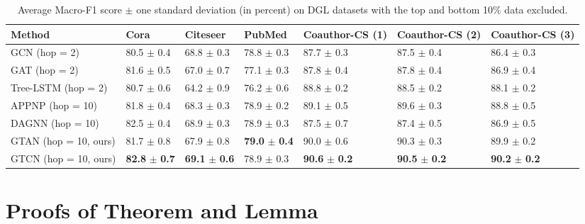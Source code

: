 \documentclass[lettersize,journal]{IEEEtran}
\theoremstyle{plain}
\theoremstyle{definition}
\theoremstyle{remark}
\begin{document}
\appendices
\begin{table*}[t]
	\caption{Average Macro-F1 score $\pm$ one standard deviation (in percent) on DGL datasets with the top and bottom 10\% data excluded.}
	\label{tb:F1}
	\begin{center}
		\begin{tabularx}{0.9\textwidth}{p{3.5cm} p{1.5cm} p{1.5cm} p{1.5cm} p{1.5cm} p{1.5cm} p{1.5cm}}
			\toprule
			\textbf{Method}  &\textbf{Cora} &\textbf{Citeseer}
			&\textbf{PubMed} &\textbf{Coauthor-CS (1)}
			&\textbf{Coauthor-CS (2)}
			&\textbf{Coauthor-CS (3)} \\
			\midrule
			GCN (hop = 2)  &80.5 $\pm$ 0.4 &68.8 $\pm$ 0.3 &78.8 $\pm$ 0.3 
			&87.7 $\pm$ 0.3 &87.5 $\pm$ 0.4 &86.4 $\pm$ 0.3\\
			GAT (hop = 2) &81.6 $\pm$ 0.5 &67.0 $\pm$ 0.7 &77.1 $\pm$ 0.3 &87.8 $\pm$ 0.4 &87.8 $\pm$ 0.4 &86.9 $\pm$ 0.4\\
			Tree-LSTM (hop = 2) &80.7 $\pm$ 0.6 &64.2 $\pm$ 0.9 &76.2 $\pm$ 0.6 &88.8 $\pm$ 0.2 &88.5 $\pm$ 0.2 &88.1 $\pm$ 0.2\\
			APPNP (hop = 10) &81.8 $\pm$ 0.4 &68.3 $\pm$ 0.3 &78.9 $\pm$ 0.2 &89.1 $\pm$ 0.5 &89.6 $\pm$ 0.3 &88.8 $\pm$ 0.5\\
			DAGNN (hop = 10) &82.5 $\pm$ 0.4 &68.9 $\pm$ 0.3 &78.9 $\pm$ 0.3 &87.5 $\pm$ 0.7 &87.4 $\pm$ 0.5 &86.9 $\pm$ 0.5\\
\midrule
			GTAN (hop = 10, ours) &81.7 $\pm$ 0.8 &67.9 $\pm$ 0.8 &\textbf{79.0} $\pm$ \textbf{0.4} &90.0 $\pm$ 0.6 &90.3 $\pm$ 0.3 &89.9 $\pm$ 0.2\\
			GTCN (hop = 10, ours) &\textbf{82.8} $\pm$ \textbf{0.7} &\textbf{69.1} $\pm$ \textbf{0.6} &78.9 $\pm$ 0.3 &\textbf{90.6} $\pm$ \textbf{0.2} &\textbf{90.5} $\pm$ \textbf{0.2} &\textbf{90.2} $\pm$ \textbf{0.2}\\
			\bottomrule
		\end{tabularx}
	\end{center}
\end{table*}
\section{Proofs of Theorem and Lemma}
\label{proof}
\end{document}
